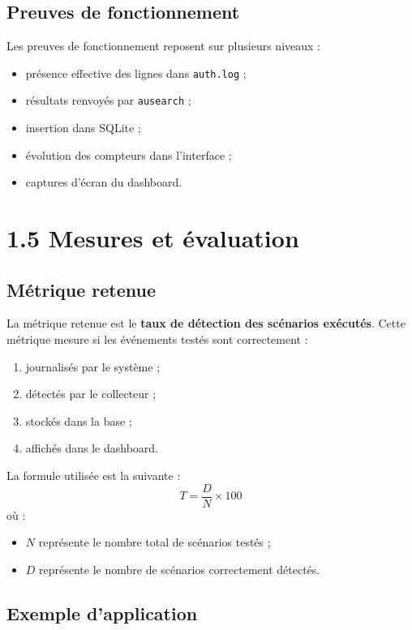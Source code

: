 \documentclass[12pt,a4paper]{article}
\begin{document}
\subsection{Preuves de fonctionnement}

Les preuves de fonctionnement reposent sur plusieurs niveaux :
\begin{itemize}
    \item présence effective des lignes dans \texttt{auth.log} ;
    \item résultats renvoyés par \texttt{ausearch} ;
    \item insertion dans SQLite ;
    \item évolution des compteurs dans l’interface ;
    \item captures d’écran du dashboard.
\end{itemize}

\section{1.5 Mesures et évaluation}

\subsection{Métrique retenue}

La métrique retenue est le \textbf{taux de détection des scénarios exécutés}. Cette métrique mesure si les événements testés sont correctement :
\begin{enumerate}
    \item journalisés par le système ;
    \item détectés par le collecteur ;
    \item stockés dans la base ;
    \item affichés dans le dashboard.
\end{enumerate}

La formule utilisée est la suivante :
\[
T = \frac{D}{N} \times 100
\]
où :
\begin{itemize}
    \item $N$ représente le nombre total de scénarios testés ;
    \item $D$ représente le nombre de scénarios correctement détectés.
\end{itemize}

\subsection{Exemple d’application}
\end{document}
